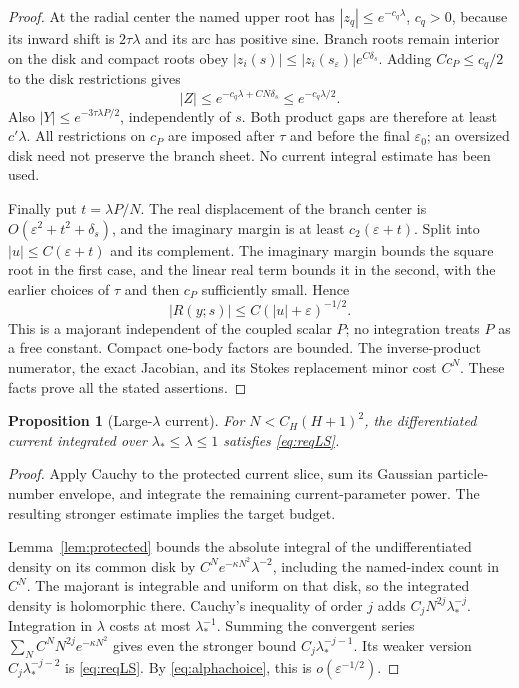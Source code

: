 \documentclass[11pt]{article}
\numberwithin{equation}{section}
\newtheorem{proposition}[theorem]{Proposition}
\theoremstyle{definition}
\newcommand{\eps}{\varepsilon}
\begin{document}
\begin{proof}
At the radial center the named upper root has
\(|z_q|\le e^{-c_q\lambda}\), \(c_q>0\), because its inward
shift is \(2\tau\lambda\) and its arc has positive sine.
Branch roots remain interior on the disk and compact roots obey
\(|z_i(s)|\le |z_i(s_\eps)|e^{C\delta_s}\).
Adding \(Cc_P\le c_q/2\) to the disk restrictions gives
\[
 |Z|\le e^{-c_q\lambda+CN\delta_s}\le e^{-c_q\lambda/2}.
\]
Also \(|Y|\le e^{-3\tau\lambda P/2}\), independently of \(s\).
Both product gaps are therefore at least \(c'\lambda\).
All restrictions on \(c_P\) are imposed after \(\tau\) and
before the final \(\eps_0\); an oversized disk need not preserve
the branch sheet. No current integral estimate has been used.

Finally put \(t=\lambda P/N\). The real displacement of the
branch center is \(O(\eps^2+t^2+\delta_s)\), and the imaginary
margin is at least \(c_2(\eps+t)\).
Split into \(|u|\le C(\eps+t)\) and its complement.
The imaginary margin bounds the square root in the first
case, and the linear real term bounds it in the second, with
the earlier choices of \(\tau\) and then \(c_P\) sufficiently small. Hence
\[
 |R(y;s)|\le C(|u|+\eps)^{-1/2}.
\]
This is a majorant independent of the coupled scalar \(P\);
no integration treats \(P\) as a free constant. Compact
one-body factors are bounded. The inverse-product numerator,
the exact Jacobian, and its Stokes replacement minor cost
\(C^N\). These facts prove all the stated assertions.
\end{proof}

\begin{proposition}[Large-\(\lambda\) current]\label{prop:largeS}
For \(N<C_H(H+1)^2\), the differentiated current integrated over
\(\lambda_*\le\lambda\le1\) satisfies \eqref{eq:reqLS}.
\end{proposition}
\begin{proof}
Apply Cauchy to the protected current slice, sum its Gaussian particle-number envelope, and integrate the remaining current-parameter power. The resulting stronger estimate implies the target budget.

Lemma~\ref{lem:protected} bounds the absolute integral of
the undifferentiated density on its common disk by
\(C^Ne^{-\kappa N^2}\lambda^{-2}\), including the named-index
count in \(C^N\). The majorant is integrable and uniform on
that disk, so the integrated density is holomorphic there.
Cauchy's inequality of order \(j\) adds
\(C_jN^{2j}\lambda_*^{-j}\). Integration in \(\lambda\) costs
at most \(\lambda_*^{-1}\). Summing the convergent series
\(\sum_N C^NN^{2j}e^{-\kappa N^2}\) gives even the stronger
bound \(C_j\lambda_*^{-j-1}\). Its weaker version
\(C_j\lambda_*^{-j-2}\) is \eqref{eq:reqLS}.
By \eqref{eq:alphachoice}, this is \(o(\eps^{-1/2})\).
\end{proof}
\end{document}
